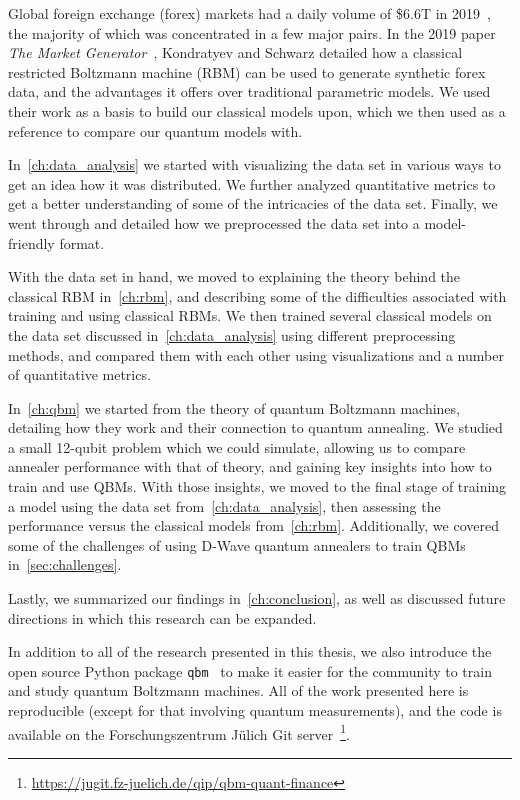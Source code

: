Global foreign exchange (forex) markets had a daily volume of \$6.6T in 2019~\cite{bis_2019}, the majority of which was concentrated in a few major pairs.
In the 2019 paper \textit{The Market Generator}~\cite{kondratyev_2019}, Kondratyev and Schwarz detailed how a classical restricted Boltzmann machine (RBM) can be used to generate synthetic forex data, and the advantages it offers over traditional parametric models.
We used their work as a basis to build our classical models upon, which we then used as a reference to compare our quantum models with.

In~\cref{ch:data_analysis} we started with visualizing the data set in various ways to get an idea how it was distributed.
We further analyzed quantitative metrics to get a better understanding of some of the intricacies of the data set.
Finally, we went through and detailed how we preprocessed the data set into a model-friendly format.

With the data set in hand, we moved to explaining the theory behind the classical RBM in~\cref{ch:rbm}, and describing some of the difficulties associated with training and using classical RBMs.
We then trained several classical models on the data set discussed in~\cref{ch:data_analysis} using different preprocessing methods, and compared them with each other using visualizations and a number of quantitative metrics.

In~\cref{ch:qbm} we started from the theory of quantum Boltzmann machines, detailing how they work and their connection to quantum annealing.
We studied a small 12-qubit problem which we could simulate, allowing us to compare annealer performance with that of theory, and gaining key insights into how to train and use QBMs.
With those insights, we moved to the final stage of training a model using the data set from~\cref{ch:data_analysis}, then assessing the performance versus the classical models from~\cref{ch:rbm}.
Additionally, we covered some of the challenges of using D-Wave quantum annealers to train QBMs in~\cref{sec:challenges}.

Lastly, we summarized our findings in~\cref{ch:conclusion}, as well as discussed future directions in which this research can be expanded.

In addition to all of the research presented in this thesis, we also introduce the open source Python package \texttt{qbm}~\cite{qbm} to make it easier for the community to train and study quantum Boltzmann machines.
All of the work presented here is reproducible (except for that involving quantum measurements), and the code is available on the Forschungszentrum J\"ulich Git server~\footnote{\url{https://jugit.fz-juelich.de/qip/qbm-quant-finance}}.
